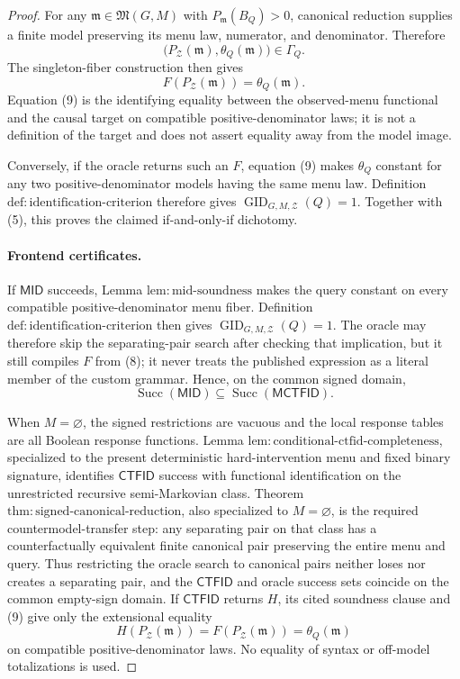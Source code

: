 \documentclass{article}
\begin{document}
\begin{proof}
For any \(\mathfrak m\in\mathfrak M(G,M)\) with \(P_{\mathfrak m}(B_Q)>0\), canonical reduction supplies a finite model preserving its menu law, numerator, and denominator.  Therefore
\[
 \bigl(P_{\mathcal Z}(\mathfrak m),\theta_Q(\mathfrak m)\bigr)\in\Gamma_Q.
\]
The singleton-fiber construction then gives
\[
 F(P_{\mathcal Z}(\mathfrak m))=\theta_Q(\mathfrak m).
\tag{9}
\]
Equation (9) is the identifying equality between the observed-menu functional and the causal target on compatible positive-denominator laws; it is not a definition of the target and does not assert equality away from the model image.

Conversely, if the oracle returns such an \(F\), equation (9) makes \(\theta_Q\) constant for any two positive-denominator models having the same menu law.  Definition \(\mathrm{def:identification\text{-}criterion}\) therefore gives \(\operatorname{GID}_{G,M,\mathcal Z}(Q)=1\).  Together with (5), this proves the claimed if-and-only-if dichotomy.

\paragraph{Frontend certificates.}
If \(\mathsf{MID}\) succeeds, Lemma \(\mathrm{lem:mid\text{-}soundness}\) makes the query constant on every compatible positive-denominator menu fiber.  Definition \(\mathrm{def:identification\text{-}criterion}\) then gives \(\operatorname{GID}_{G,M,\mathcal Z}(Q)=1\).  The oracle may therefore skip the separating-pair search after checking that implication, but it still compiles \(F\) from (8); it never treats the published expression as a literal member of the custom grammar.  Hence, on the common signed domain,
\[
 \operatorname{Succ}(\mathsf{MID})
 \subseteq
 \operatorname{Succ}(\mathsf{MCTFID}).
\tag{10}
\]

When \(M=\varnothing\), the signed restrictions are vacuous and the local response tables are all Boolean response functions.  Lemma \(\mathrm{lem:conditional\text{-}ctfid\text{-}completeness}\), specialized to the present deterministic hard-intervention menu and fixed binary signature, identifies \(\mathsf{CTFID}\) success with functional identification on the unrestricted recursive semi-Markovian class.  Theorem \(\mathrm{thm:signed\text{-}canonical\text{-}reduction}\), also specialized to \(M=\varnothing\), is the required countermodel-transfer step: any separating pair on that class has a counterfactually equivalent finite canonical pair preserving the entire menu and query.  Thus restricting the oracle search to canonical pairs neither loses nor creates a separating pair, and the \(\mathsf{CTFID}\) and oracle success sets coincide on the common empty-sign domain.  If \(\mathsf{CTFID}\) returns \(H\), its cited soundness clause and (9) give only the extensional equality
\[
 H(P_{\mathcal Z}(\mathfrak m))
 =F(P_{\mathcal Z}(\mathfrak m))
 =\theta_Q(\mathfrak m)
\]
on compatible positive-denominator laws.  No equality of syntax or off-model totalizations is used.


\end{proof}
\end{document}
